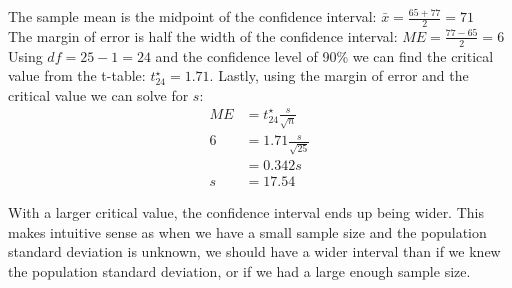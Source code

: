 
{
{
The sample mean is the midpoint of the confidence interval: $\bar{x} = \frac{65 + 77}{2} = 71$ \\
The margin of error is half the width of the confidence interval: $ME = \frac{77 - 65}{2} = 6$ \\
Using $df = 25 - 1 = 24$ and the confidence level of 90\% we can find the critical value from the t-table: $t^{\star}_{24} = 1.71$. Lastly, using the margin of error and the critical value we can solve for $s$:
\begin{align*}
ME &= t^{\star}_{24} \frac{s}{\sqrt{n}} \\
6 &= 1.71 \frac{s}{\sqrt{25}} \\
&= 0.342 s \\
s &= 17.54
\end{align*}
}
}


{
With a larger critical value, the confidence interval ends up being wider. This makes intuitive sense as when we have a small sample size and the population standard deviation is unknown, we should have a wider interval than if we knew the population standard deviation, or if we had a large enough sample size.
}


